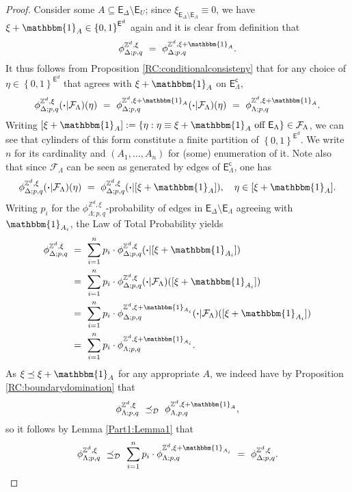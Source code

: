 \documentclass[12pt]{article}
\newcommand{\D}{\mathcal{D}}
\newcommand{\E}{\mathsf{E}}
\newcommand{\F}{\mathcal{F}}
\newcommand{\Z}{\mathbb{Z}}
\newcommand{\set}[1]{\left\{#1\right\}}
\newcommand{\pika}{\boldsymbol{\cdot}}
\newcommand{\1}{\mathbbm{1}}
\renewcommand{\c}{\mathsf{c}}
\newcommand{\5}{\vspace{0.5cm}}
\theoremstyle{definition}
\begin{document}
\begin{proof}
Consider some $A\subseteq\E_\Delta\setminus\E_U$; since $\xi_{\E_\Delta\setminus\E_\Lambda}\equiv 0$, we have $\xi+\1_A\in\set{0,1}^{\E^d}$ again and it is clear from definition that
$$\phi_{\Delta;p,q}^{\Z^d,\xi} ~=~ \phi_{\Delta;p,q}^{\Z^d,\xi+\1_A}.$$
It thus follows from Proposition \ref{RC:conditionalconsisteny} that for any choice of $\eta\in\set{0,1}^{\E^d}$ that agrees with $\xi+\1_A$ on $\E_\Lambda^\c$,
$$\phi_{\Delta;p,q}^{\Z^d,\xi}(\pika|\F_\Lambda)(\eta) ~=~ \phi_{\Delta;p,q}^{\Z^d,\xi+\1_A}(\pika|\F_\Lambda)(\eta) ~=~ \phi_{\Lambda;p,q}^{\Z^d,\xi+\1_A}.$$ 
Writing $[\xi+\1_A]:=\set{\eta:\eta\equiv \xi+\1_A~\text{off}~\E_\Lambda}\in\F_\Lambda$, we can see that cylinders of this form constitute a finite partition of $\set{0,1}^{\E^d}$. We write $n$ for its cardinality and $(A_1,\ldots,A_n)$ for (some) enumeration of it. Note also that since $\F_\Lambda$ can be seen as generated by edges of $\E_\Lambda^\c$, one has 
$$\phi_{\Delta;p,q}^{\Z^d,\xi}(\pika|\F_\Lambda)(\eta) ~=~ \phi_{\Delta;p,q}^{\Z^d,\xi}(\pika|[\xi+\1_A]), \quad \eta\in[\xi+\1_A].$$
Writing $p_i$ for the $\phi_{\Lambda;p,q}^{\Z^d,\xi}$-probability of edges in $\E_\Delta\setminus\E_\Lambda$ agreeing with $\1_{A_i}$, the Law of Total Probability yields
\begin{align*}
\phi_{\Delta;p,q}^{\Z^d,\xi} ~&=~ \sum_{i=1}^n p_i\cdot\phi_{\Delta;p,q}^{\Z^d,\xi}(\pika|[\xi+\1_{A_i}]) \\
&=~ \sum_{i=1}^n p_i\cdot\phi_{\Delta;p,q}^{\Z^d,\xi}(\pika|\F_\Lambda)([\xi+\1_{A_i}]) \\
&=~ \sum_{i=1}^n p_i\cdot\phi_{\Delta;p,q}^{\Z^d,\xi+\1_{A_i}}(\pika|\F_\Lambda)([\xi+\1_{A_i}]) \\
&=~ \sum_{i=1}^n p_i\cdot\phi_{\Lambda;p,q}^{\Z^d,\xi+\1_{A_i}}.
\end{align*}
As $\xi\preceq\xi+\1_A$ for any appropriate $A$, we indeed have by Proposition \ref{RC:boundarydomination} that
$$\phi_{\Lambda;p,q}^{\Z^d,\xi} ~\preceq_\D~ \phi_{\Lambda,p,q}^{\Z^d,\xi+\1_A},$$
so it follows by Lemma \ref{Part1:Lemma1} that
$$\phi_{\Lambda;p,q}^{\Z^d,\xi} ~\preceq_\D~ \sum_{i=1}^n p_i\cdot\phi_{\Lambda;p,q}^{\Z^d,\xi+\1_{A_i}} ~=~ \phi_{\Delta;p,q}^{\Z^d,\xi}.$$
\end{proof}
\end{document}
